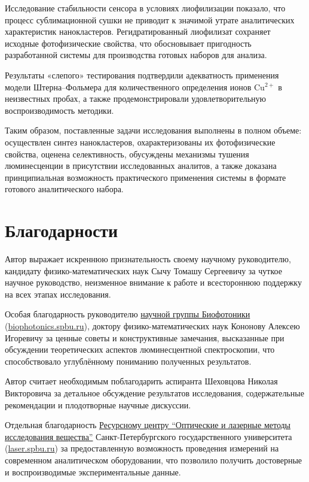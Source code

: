 \documentclass[a4paper, 12pt]{article}
\begin{document}
\begin{onehalfspace}
Исследование стабильности сенсора в условиях лиофилизации показало, что процесс сублимационной сушки не приводит к значимой утрате аналитических характеристик нанокластеров. Регидратированный лиофилизат сохраняет исходные фотофизические свойства, что обосновывает пригодность разработанной системы для производства готовых наборов для анализа.

Результаты «слепого» тестирования подтвердили адекватность применения модели Штерна–Фольмера для количественного определения ионов Cu$^{2+}$ в неизвестных пробах, а также продемонстрировали удовлетворительную воспроизводимость методики.

Таким образом, поставленные задачи исследования выполнены в полном объеме: осуществлен синтез нанокластеров, охарактеризованы их фотофизические свойства, оценена се\-лек\-тив\-ность, обусуждены механизмы тушения люминесценции в присутствии исследованных аналитов, а также доказана принципиальная возможность практического применения системы в формате готового аналитического набора.

\newpage
\section*{Благодарности}

Автор выражает искреннюю признательность своему научному руководителю, кандидату физико-математических наук Сычу Томашу Сергеевичу за чуткое научное руководство, неизменное внимание к работе и всестороннюю поддержку на всех этапах исследования.

Особая благодарность руководителю \href{https://biophotonics.spbu.ru/ru/}{научной группы Биофотоники} (\url{biophotonics.spbu.ru}), доктору фи\-зи\-ко-ма\-те\-ма\-ти\-чес\-ких наук Кононову Алексею Игоревичу за ценные советы и конструктивные замечания, высказанные при обсуждении теоретических аспектов люминесцентной спектроскопии, что способствовало углублённому пониманию полученных результатов.

Автор считает необходимым поблагодарить аспиранта Шеховцова Николая Викторовича за детальное обсуждение результатов исследования, содержательные рекомендации и плодотворные научные дискуссии.

Отдельная благодарность \href{https://laser.spbu.ru/}{Ресурсному центру \enquote{Оптические и лазерные методы исследования вещества}} Санкт-Петербургского государственного университета (\url{laser.spbu.ru}) за предоставленную возможность проведения измерений на современном аналитическом оборудовании, что позволило получить достоверные и воспроизводимые экспериментальные данные.

\end{onehalfspace}
\newpage


\printbibliography[title={Список использованных литературных источников и информационных материалов}]
\end{document}
